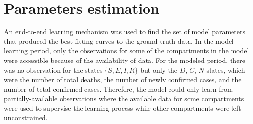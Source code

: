 \section{Parameters estimation}
\label{sec:methodologies-parameters-estimation}

An end-to-end learning mechanism was used to find the set of model parameters that produced the best fitting curves to the ground truth data.
In the model learning period, only the observations for some of the compartments in the model were accessible because of the availability of data.
For the modeled period, there was no observation for the states $\{S, E, I, R\}$ but only the $D$, $C$, $N$ states, which were the number of total deaths, the number of newly confirmed cases, and the number of total confirmed cases.
Therefore, the model could only learn from partially-available observations where the available data for some compartments were used to supervise the learning process while other compartments were left unconstrained.

